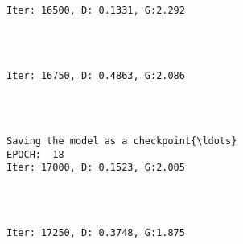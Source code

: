 \documentclass[11pt]{article}
\begin{document}
    \begin{center}
    \end{center}
    { \hspace*{\fill} \\}
    
    \begin{Verbatim}[commandchars=\\\{\}]

Iter: 16500, D: 0.1331, G:2.292
    \end{Verbatim}

    \begin{center}
    \end{center}
    { \hspace*{\fill} \\}
    
    \begin{Verbatim}[commandchars=\\\{\}]

Iter: 16750, D: 0.4863, G:2.086
    \end{Verbatim}

    \begin{center}
    \end{center}
    { \hspace*{\fill} \\}
    
    \begin{Verbatim}[commandchars=\\\{\}]

Saving the model as a checkpoint{\ldots}
EPOCH:  18
Iter: 17000, D: 0.1523, G:2.005
    \end{Verbatim}

    \begin{center}
    \end{center}
    { \hspace*{\fill} \\}
    
    \begin{Verbatim}[commandchars=\\\{\}]

Iter: 17250, D: 0.3748, G:1.875
    \end{Verbatim}
\end{document}
